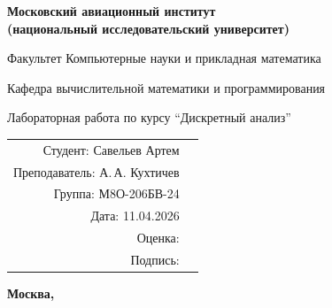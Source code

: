\begin{titlepage}
\begin{center}
\bfseries
{\Large Московский авиационный институт\\ (национальный исследовательский университет)}

\vspace{48pt}
{\large Факультет Компьютерные науки и прикладная математика}

\vspace{36pt}
{\large Кафедра вычислительной математики и программирования}

\vspace{48pt}
Лабораторная работа  по курсу \enquote{Дискретный анализ}
\end{center}

\vspace{72pt}
\begin{flushright}
\begin{tabular}{rl}
Студент: Савельев Артем \\
Преподаватель: А.\,А. Кухтичев& \\
Группа: М8О-206БВ-24& \\
Дата: 11.04.2026& \\
Оценка: & \\
Подпись: & \\
\end{tabular}
\end{flushright}

\vfill
\begin{center}
\bfseries
Москва, \the\year
\end{center}
\end{titlepage}
\pagebreak